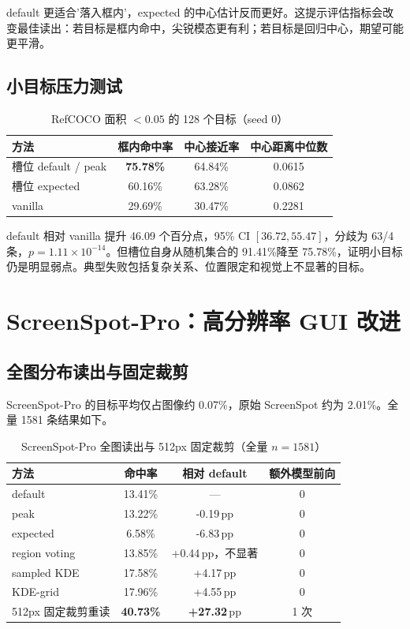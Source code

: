 \documentclass[UTF8,a4paper,11pt,fontset=none]{ctexart}
\newcommand{\pp}{\ensuremath{\,\mathrm{pp}}}
\begin{document}
default 更适合'落入框内'，expected 的中心估计反而更好。这提示评估指标会改变最佳读出：若目标是框内命中，尖锐模态更有利；若目标是回归中心，期望可能更平滑。

\subsection{小目标压力测试}
\begin{table}[H]
\centering\small
\caption{RefCOCO 面积 $<0.05$ 的 128 个目标（seed 0）}
\begin{tabular}{lccc}
\toprule
方法 & 框内命中率 & 中心接近率 & 中心距离中位数 \\
\midrule
槽位 default / peak & \textbf{75.78\%} & 64.84\% & 0.0615 \\
槽位 expected & 60.16\% & 63.28\% & 0.0862 \\
vanilla & 29.69\% & 30.47\% & 0.2281 \\
\bottomrule
\end{tabular}
\end{table}

default 相对 vanilla 提升 46.09 个百分点，95\% CI $[36.72,55.47]$，分歧为 63/4 条，$p=1.11\times10^{-14}$。但槽位自身从随机集合的 91.41\%降至 75.78\%，证明小目标仍是明显弱点。典型失败包括复杂关系、位置限定和视觉上不显著的目标。

\section{ScreenSpot-Pro：高分辨率 GUI 改进}
\subsection{全图分布读出与固定裁剪}
ScreenSpot-Pro 的目标平均仅占图像约 0.07\%，原始 ScreenSpot 约为 2.01\%\cite{screenspotpro}。全量 1581 条结果如下。
\begin{table}[H]
\centering\small
\caption{ScreenSpot-Pro 全图读出与 512px 固定裁剪（全量 $n=1581$）}
\begin{tabular}{lccc}
\toprule
方法 & 命中率 & 相对 default & 额外模型前向 \\
\midrule
default & 13.41\% & --- & 0 \\
peak & 13.22\% & -0.19\pp & 0 \\
expected & 6.58\% & -6.83\pp & 0 \\
region voting & 13.85\% & +0.44\pp，不显著 & 0 \\
sampled KDE & 17.58\% & +4.17\pp & 0 \\
KDE-grid & 17.96\% & +4.55\pp & 0 \\
512px 固定裁剪重读 & \textbf{40.73\%} & \textbf{+27.32\pp} & 1 次 \\
\bottomrule
\end{tabular}
\end{table}
\end{document}
